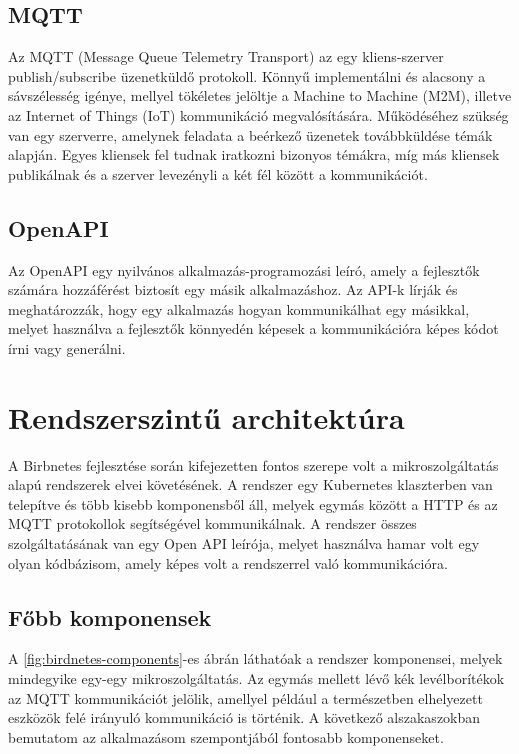 \subsection{MQTT}
\label{subsect:mqtt}
Az MQTT (Message Queue Telemetry Transport) az egy kliens-szerver publish/subscribe üzenetküldő protokoll. Könnyű implementálni és alacsony a sávszélesség igénye,
mellyel tökéletes jelöltje a Machine to Machine (M2M), illetve az Internet of Things (IoT) kommunikáció megvalósítására.
Működéséhez szükség van egy szerverre, amelynek feladata a beérkező üzenetek továbbküldése témák alapján. Egyes kliensek fel tudnak iratkozni bizonyos témákra, míg más kliensek publikálnak
és a szerver levezényli a két fél között a kommunikációt.

\subsection{OpenAPI}
Az OpenAPI egy nyilvános alkalmazás-programozási leíró, amely a fejlesztők számára hozzáférést biztosít egy másik alkalmazáshoz.
Az API-k lírják és meghatározzák, hogy egy alkalmazás hogyan kommunikálhat egy másikkal, 
melyet használva a fejlesztők könnyedén képesek a kommunikációra képes kódot írni vagy generálni.

\section{Rendszerszintű architektúra}
A Birbnetes fejlesztése során kifejezetten fontos szerepe volt a mikroszolgáltatás alapú rendszerek elvei követésének.
A rendszer egy Kubernetes klaszterben van telepítve és több kisebb komponensből áll, melyek egymás között a HTTP és az MQTT protokollok segítségével kommunikálnak.
A rendszer összes szolgáltatásának van egy Open API leírója, melyet használva hamar volt egy olyan kódbázisom, amely képes volt a rendszerrel való kommunikációra.


\subsection{Főbb komponensek}
A \ref{fig:birdnetes-components}-es ábrán láthatóak a rendszer komponensei, melyek mindegyike egy-egy mikroszolgáltatás.
Az egymás mellett lévő kék levélborítékok az MQTT kommunikációt jelölik,
amellyel például a természetben elhelyezett eszközök felé irányuló kommunikáció is történik.
A következő alszakaszokban bemutatom az alkalmazásom szempontjából fontosabb komponenseket.

